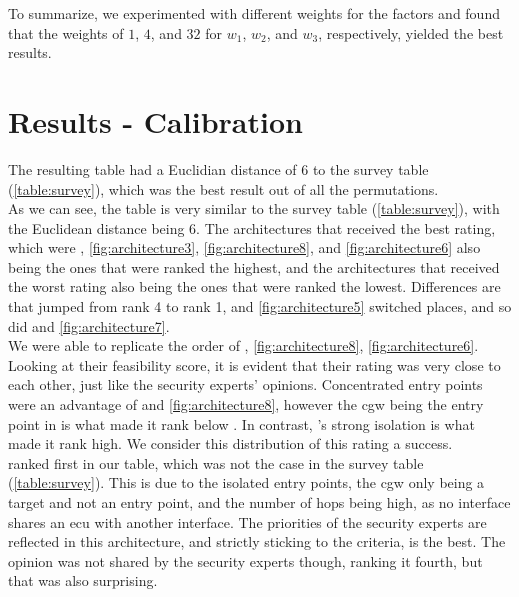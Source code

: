 To summarize, we experimented with different weights for the factors and found that the weights of 
$1$, $4$, and $32$ for $w_{1}$, $w_{2}$, and $w_{3}$, respectively, yielded the best results.


\section{Results - Calibration}
\label{sec:calibration}

The resulting table had a Euclidian distance of 6 to the survey table (\ref{table:survey}), which was the best result out of all the permutations.\\

As we can see, the table is very similar to the survey table (\ref{table:survey}), with the Euclidean distance being 6.
The architectures that received the best rating, which were 
, \ref{fig:architecture3}, \ref{fig:architecture8}, and \ref{fig:architecture6} 
also being the ones that were ranked the highest,
and the architectures that received the worst rating also being the ones that were ranked the lowest.
Differences are that  jumped from rank 4 to rank 1,  and \ref{fig:architecture5} switched places, 
and so did  and \ref{fig:architecture7}.\\

We were able to replicate the order of , \ref{fig:architecture8}, \ref{fig:architecture6}.
Looking at their feasibility score, it is evident that their rating was very close to each other, just like the security experts' opinions.
Concentrated entry points were an advantage of  and \ref{fig:architecture8}, 
however the \acrshort{cgw} being the entry point in  is what made it rank below .
In contrast, 's strong isolation is what made it rank high.
We consider this distribution of this rating a success.\\

 ranked first in our table, which was not the case in the survey table (\ref{table:survey}).
This is due to the isolated entry points, the \acrshort{cgw} only being a target and not an entry point, 
and the number of hops being high, as no interface shares an \acrshort{ecu} with another interface.
The priorities of the security experts are reflected in this architecture, and
strictly sticking to the criteria,  is the best.
The opinion was not shared by the security experts though, ranking it fourth, but that was also surprising.\\


